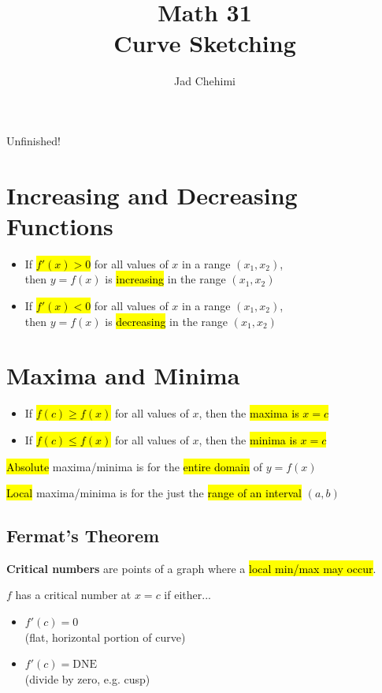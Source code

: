 \documentclass[a4paper,12pt]{article}
\title{Math 31 \\ Curve Sketching}
\author{Jad Chehimi}
\begin{document}
\maketitle

\begin{center}
\Huge
Unfinished!
\normalsize
\end{center}

\tableofcontents

\pagebreak

\section{Increasing and Decreasing Functions}
\begin{itemize}
    \item{If \hl{$f'(x) > 0$} for all values of $x$ in a range $(x_1, x_2)$,\\then $y = f(x)$ is \hl{increasing} in the range $(x_1, x_2)$}
    \item{If \hl{$f'(x) < 0$} for all values of $x$ in a range $(x_1, x_2)$,\\then $y = f(x)$ is \hl{decreasing} in the range $(x_1, x_2)$}
\end{itemize}

\section{Maxima and Minima}
\begin{itemize}
    \item{If \hl{$f(c) \geq f(x)$} for all values of $x$, then the \hl{maxima is $x = c$}}
    \item{If \hl{$f(c) \leq f(x)$} for all values of $x$, then the \hl{minima is $x = c$}}
\end{itemize}

\hl{Absolute} maxima/minima is for the \hl{entire domain} of $y = f(x)$

\hl{Local} maxima/minima is for the just the \hl{range of an interval} $(a, b)$

\subsection{Fermat's Theorem}
\textbf{Critical numbers} are points of a graph where a \hl{local min/max may occur}.

$f$ has a critical number at $x = c$ if either...
\begin{itemize}
    \item{$f'(c) = 0$\\(flat, horizontal portion of curve)}
    \item{$f'(c) = \textrm{DNE}$\\(divide by zero, e.g. cusp)}
\end{itemize}
\end{document}

